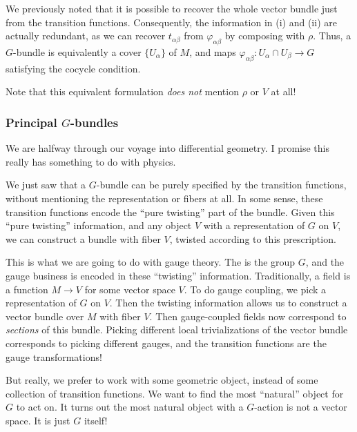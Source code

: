 \documentclass[a4paper]{article}
\begin{document}
We previously noted that it is possible to recover the whole vector bundle just from the transition functions. Consequently, the information in (i) and (ii) are actually redundant, as we can recover $t_{\alpha\beta}$ from $\varphi_{\alpha\beta}$ by composing with $\rho$. Thus, a $G$-bundle is equivalently a cover $\{U_\alpha\}$ of $M$, and maps $\varphi_{\alpha\beta}: U_\alpha \cap U_\beta \to G$ satisfying the cocycle condition.

Note that this equivalent formulation \emph{does not} mention $\rho$ or $V$ at all!

\subsubsection*{Principal \texorpdfstring{$G$}{G}-bundles}
We are halfway through our voyage into differential geometry. I promise this really has something to do with physics.

We just saw that a $G$-bundle can be purely specified by the transition functions, without mentioning the representation or fibers at all. In some sense, these transition functions encode the ``pure twisting'' part of the bundle. Given this ``pure twisting'' information, and any object $V$ with a representation of $G$ on $V$, we can construct a bundle with fiber $V$, twisted according to this prescription.

This is what we are going to do with gauge theory. The  is the group $G$, and the gauge business is encoded in these ``twisting'' information. Traditionally, a field is a function $M \to V$ for some vector space $V$. To do gauge coupling, we pick a representation of $G$ on $V$. Then the twisting information allows us to construct a vector bundle over $M$ with fiber $V$. Then gauge-coupled fields now correspond to \emph{sections} of this bundle. Picking different local trivializations of the vector bundle corresponds to picking different gauges, and the transition functions are the gauge transformations!

But really, we prefer to work with some geometric object, instead of some collection of transition functions. We want to find the most ``natural'' object for $G$ to act on. It turns out the most natural object with a $G$-action is not a vector space. It is just $G$ itself!
\end{document}

